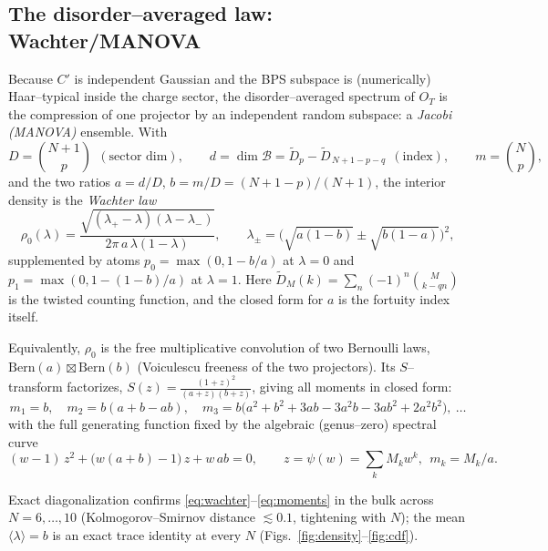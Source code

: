 \documentclass[11pt]{article}
\newcommand{\OT}{O_T}
\newcommand{\Bern}{\mathrm{Bern}}
\newif\ifpedagogical
\newcommand{\ped}[1]{\ifpedagogical\par\smallskip{\small\color{pedcol}%
  \leftskip=1.4em\rightskip=1.4em\noindent$\triangleright$~\textit{Plain-language aside.}~#1\par}%
  \par\smallskip\fi}
\begin{document}
\subsection{The disorder--averaged law: Wachter/MANOVA}
Because $C'$ is independent Gaussian and the BPS subspace is (numerically) Haar--typical inside
the charge sector, the disorder--averaged spectrum of $\OT$ is the compression of one projector
by an independent random subspace: a \emph{Jacobi (MANOVA)} ensemble. With
\begin{equation}
  D=\binom{N+1}{p}\ \ (\text{sector dim}),\qquad
  d=\dim\mathcal B=\widetilde D_p-\widetilde D_{\,N+1-p-q}\ \ (\text{index}),\qquad
  m=\binom{N}{p},
\end{equation}
and the two ratios $a=d/D$, $b=m/D=(N{+}1{-}p)/(N{+}1)$, the interior density is the
\emph{Wachter law}
\begin{equation}
  \rho_0(\lambda)=\frac{\sqrt{(\lambda_+-\lambda)(\lambda-\lambda_-)}}{2\pi\,a\,\lambda(1-\lambda)},
  \qquad
  \lambda_\pm=\big(\sqrt{a(1-b)}\pm\sqrt{b(1-a)}\big)^2 ,
  \label{eq:wachter}
\end{equation}
supplemented by atoms $p_0=\max(0,1-b/a)$ at $\lambda=0$ and $p_1=\max(0,1-(1-b)/a)$ at
$\lambda=1$. Here $\widetilde D_M(k)=\sum_n(-1)^n\binom{M}{k-qn}$ is the twisted counting function,
and the closed form for $a$ is the fortuity index itself.

Equivalently, $\rho_0$ is the free multiplicative convolution of two Bernoulli laws,
$\Bern(a)\boxtimes\Bern(b)$ (Voiculescu freeness of the two projectors). Its $S$--transform
factorizes, $S(z)=\tfrac{(1+z)^2}{(a+z)(b+z)}$, giving all moments in closed form:
\begin{equation}
  m_1=b,\quad m_2=b(a+b-ab),\quad m_3=b\big(a^2+b^2+3ab-3a^2b-3ab^2+2a^2b^2\big),\ \dots
  \label{eq:moments}
\end{equation}
with the full generating function fixed by the algebraic (genus--zero) spectral curve
\begin{equation}
  (w-1)\,z^2+\big(w(a+b)-1\big)\,z+w\,ab=0 ,\qquad z=\psi(w)=\textstyle\sum_k M_k w^k,\ \ m_k=M_k/a .
  \label{eq:curve}
\end{equation}
\ped{Three names for one fact. ``Free multiplicative convolution $\boxtimes$'' is the rule that
gives the eigenvalue histogram of a product of two \emph{generic} (freely rotated) matrices from the
two factor histograms---here two projectors, of relative sizes $a$ and $b$. The ``$S$--transform''
is the tool that makes $\boxtimes$ into ordinary multiplication (like $\log$ turns products into
sums), which is why the moments come out in closed form. And ``spectral curve'' is just the equation
\eqref{eq:curve} that the moment generating function solves---an algebraic curve because it is a
quadratic. All three encode the same disk--level Wachter law.}
Exact diagonalization confirms \eqref{eq:wachter}--\eqref{eq:moments} in the bulk across
$N=6,\dots,10$ (Kolmogorov--Smirnov distance $\lesssim0.1$, tightening with $N$); the mean
$\langle\lambda\rangle=b$ is an exact trace identity at every $N$
(Figs.~\ref{fig:density}--\ref{fig:cdf}).
\end{document}
